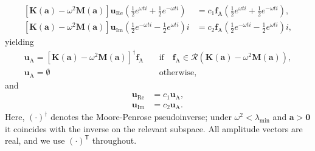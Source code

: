 \documentclass[preprint,3p]{elsarticle}
\newcommand{\T}{^{\mathsf T}}
\newcommand{\A}{\mathrm{A}}
\newcommand{\Real}{\mathrm{Re}}
\newcommand{\I}{\mathrm{Im}}
\newcommand{\range}[1]{\ensuremath{\mathcal{R}\!\left(#1\right)}}
\numberwithin{equation}{section}
\begin{document}
%
\begin{subequations}
  \begin{align}
    \left[\mathbf{K}(\mathbf{a}) - \omega^2 \mathbf{M}(\mathbf{a})\right]\mathbf{u}_\Real \left( \frac{1}{2} e^{\omega t i} + \frac{1}{2} e^{-\omega t i}  \right) &= c_1 \mathbf{f}_\A \left( \frac{1}{2} e^{\omega t i} + \frac{1}{2} e^{-\omega t i}  \right),\\
    \left[\mathbf{K}(\mathbf{a}) - \omega^2 \mathbf{M}(\mathbf{a})\right] \mathbf{u}_\I \left( \frac{1}{2} e^{-\omega t i} -\frac{1}{2} e^{\omega t i}  \right)i &=  c_2 \mathbf{f}_\A \left( \frac{1}{2} e^{-\omega t i} - \frac{1}{2} e^{\omega t i} \right)i,
  \end{align}
\end{subequations}
%
yielding
%
\begin{subequations}\label{eq:uamp}
  \begin{align}
    \mathbf{u}_\A = \left[ \mathbf{K}(\mathbf{a}) - \omega^2 \mathbf{M}(\mathbf{a})\right]^\dagger \mathbf{f}_\A \quad &\text{if} \quad \mathbf{f}_\A \in \range{\mathbf{K}(\mathbf{a}) - \omega^2 \mathbf{M}(\mathbf{a})},\\
    \mathbf{u}_\A = \emptyset \quad& \text{otherwise},
  \end{align}
\end{subequations}
%
and
%
\begin{subequations}
  \begin{align}
    \mathbf{u}_\Real &= c_1 \mathbf{u}_\A,\\
    \mathbf{u}_\I &= c_2 \mathbf{u}_\A.
  \end{align}
\end{subequations}
%
Here, $(\cdot)^\dagger$ denotes the Moore-Penrose pseudoinverse; under $\omega^2<\lambda_{\min}$ and $\mathbf{a}>\mathbf{0}$ it coincides with the inverse on the relevant subspace. All amplitude vectors are real, and we use $(\cdot)\T$ throughout.
\end{document}

